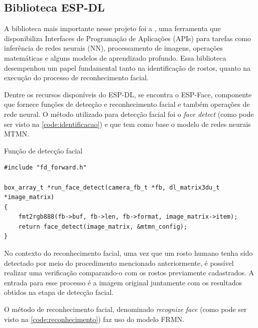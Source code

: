 \subsection{Biblioteca ESP-DL}\label{sec:formatacaoTexto}

A biblioteca mais importante nesse projeto foi a , 
uma ferramenta que disponibiliza Interfaces de Programação de Aplicações 
(APIs) para tarefas como inferência de redes neurais (NN), 
processamento de imagens, operações matemáticas 
e alguns modelos de aprendizado profundo. Essa biblioteca 
desempenhou um papel fundamental tanto na identificação de rostos, 
quanto na execução do processo de reconhecimento facial.

Dentre os recursos disponíveis do ESP-DL, se encontra o 
ESP-Face, componente que fornece funções de detecção e 
reconhecimento facial e também operações de rede neural. 
O método utilizado para detecção facial foi o \textit{face detect} 
(como pode ser visto na \autoref{code:identificacao}) 
e que tem como base o modelo de redes neurais MTMN.

\begin{sourcecode}[htb]
\caption{\label{code:identificacao}Função de detecção facial}
\begin{lstlisting}[frame=single]
#include "fd_forward.h"

box_array_t *run_face_detect(camera_fb_t *fb, dl_matrix3du_t *image_matrix)
{
    fmt2rgb888(fb->buf, fb->len, fb->format, image_matrix->item);
    return face_detect(image_matrix, &mtmn_config);
}    
\end{lstlisting}
\fonte{}
\end{sourcecode}

No contexto do reconhecimento facial, uma vez que um rosto 
humano tenha sido detectado por meio do procedimento 
mencionado anteriormente, é possível realizar uma verificação 
comparando-o com os rostos previamente cadastrados. 
A entrada para esse processo é a imagem original juntamente 
com os resultados obtidos na etapa de detecção facial.

O método de reconhecimento facial, denominado \textit{recognize face}  
(como pode ser visto na \autoref{code:reconhecimento}) 
faz uso do modelo FRMN.

